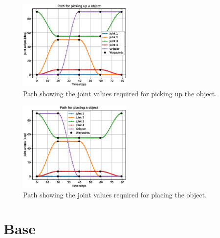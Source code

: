 \begin{figure}[H]
    \centering
    \includegraphics[width=0.5\textwidth]{chapters/img/pickup_path.eps}
    \caption{Path showing the joint values required for picking up the object.}
    \label{fig:pickup_path_interpolated}
\end{figure}


\begin{figure}[H]
    \centering
    \includegraphics[width=0.5\textwidth]{chapters/img/place_path.eps}
    \caption{Path showing the joint values required for placing the object.}
    \label{fig:place_path_interpolated}
\end{figure}






\section*{Base}


